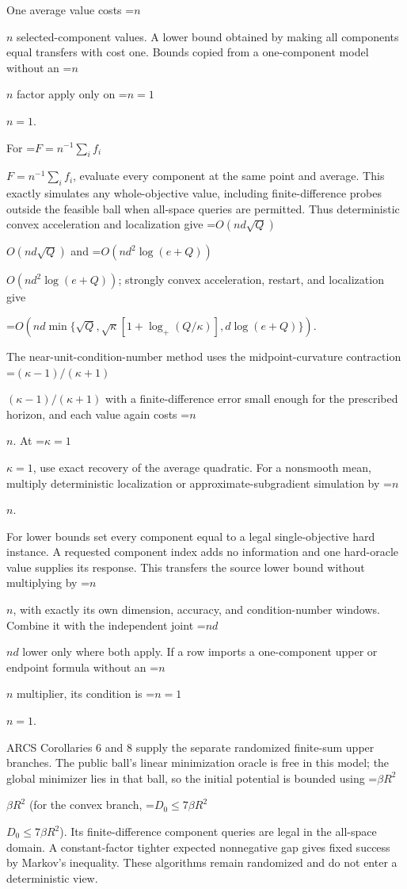 \documentclass[10pt,a4paper]{article}
\newcommand{\AtlasMath}[1]{\par\begingroup\centering\setbox0=\hbox{$\displaystyle #1$}\ifdim\wd0>1.4\linewidth\typeout{ATLAS WIDE FORMULA: \the\wd0}\fi\ifdim\wd0>\linewidth\resizebox{\linewidth}{!}{\box0}\else\box0\fi\par\endgroup}
\newcommand{\AtlasInlineMath}[1]{\begingroup\setbox0=\hbox{$#1$}\ifdim\wd0>.4\linewidth\endgroup\AtlasMath{#1}\else\endgroup$#1$\fi}
\begin{document}
One average value costs \AtlasInlineMath{n} selected-component values. A lower bound obtained by making all components equal transfers with cost one. Bounds copied from a one-component model without an \AtlasInlineMath{n} factor apply only on \AtlasInlineMath{n=1}.

For \AtlasInlineMath{F=n^{-1}\sum_i f_i}, evaluate every component at the same point and average. This exactly simulates any whole-objective value, including finite-difference probes outside the feasible ball when all-space queries are permitted. Thus deterministic convex acceleration and localization give \AtlasInlineMath{O(nd\sqrt Q)} and \AtlasInlineMath{O(nd^2\log(e+Q))}; strongly convex acceleration, restart, and localization give

\AtlasMath{O\!\left(nd\min\{\sqrt Q,\sqrt\kappa[1+\log_+(Q/\kappa)],d\log(e+Q)\}\right).}

The near-unit-condition-number method uses the midpoint-curvature contraction \AtlasInlineMath{(\kappa-1)/(\kappa+1)} with a finite-difference error small enough for the prescribed horizon, and each value again costs \AtlasInlineMath{n}. At \AtlasInlineMath{\kappa=1}, use exact recovery of the average quadratic. For a nonsmooth mean, multiply deterministic localization or approximate-subgradient simulation by \AtlasInlineMath{n}.

For lower bounds set every component equal to a legal single-objective hard instance. A requested component index adds no information and one hard-oracle value supplies its response. This transfers the source lower bound without multiplying by \AtlasInlineMath{n}, with exactly its own dimension, accuracy, and condition-number windows. Combine it with the independent joint \AtlasInlineMath{nd} lower only where both apply. If a row imports a one-component upper or endpoint formula without an \AtlasInlineMath{n} multiplier, its condition is \AtlasInlineMath{n=1}.

ARCS Corollaries 6 and 8 supply the separate randomized finite-sum upper branches. The public ball's linear minimization oracle is free in this model; the global minimizer lies in that ball, so the initial potential is bounded using \AtlasInlineMath{\beta R^2} (for the convex branch, \AtlasInlineMath{D_0\le7\beta R^2}). Its finite-difference component queries are legal in the all-space domain. A constant-factor tighter expected nonnegative gap gives fixed success by Markov's inequality. These algorithms remain randomized and do not enter a deterministic view.
\end{document}
